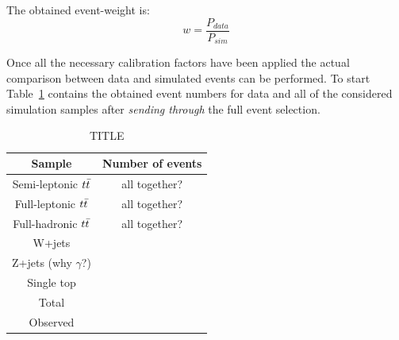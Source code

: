 The obtained event-weight is:
\begin{equation}
 w = \dfrac{P_{data}}{P_{sim}}
\end{equation}

Once all the necessary calibration factors have been applied the actual comparison between data and simulated events can be performed. 
To start Table~\ref{table::DataMCComp} contains the obtained event numbers for data and all of the considered simulation samples after \textit{sending through} the full event selection.

\begin{table}[h!t]
 \caption{TITLE} \label{table::DataMCComp}
 \centering
 \begin{tabular}{c|c}
  \hline
  Sample 			& Number of events 	\\
  \hline
  \hline
  Semi-leptonic $t\bar{t}$ 	& all together?		\\
  Full-leptonic $t\bar{t}$ 	& all together?		\\
  Full-hadronic $t\bar{t}$ 	& all together?		\\
  W+jets 			& 			\\
  Z+jets (why $\gamma$?)	& 			\\
  Single top 			& 			\\
  \hline
  Total				& 			\\
  \hline
  \hline
  Observed			&			\\
  \hline
 \end{tabular}
\end{table}







